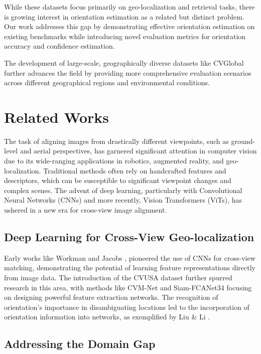 While these datasets focus primarily on geo-localization and retrieval tasks, there is growing interest in orientation estimation as a related but distinct problem. Our work addresses this gap by demonstrating effective orientation estimation on existing benchmarks while introducing novel evaluation metrics for orientation accuracy and confidence estimation.

The development of large-scale, geographically diverse datasets like CVGlobal further advances the field by providing more comprehensive evaluation scenarios across different geographical regions and environmental conditions.



\section{Related Works}

The task of aligning images from drastically different viewpoints, such as ground-level and aerial perspectives, has garnered significant attention in computer vision due to its wide-ranging applications in robotics, augmented reality, and geo-localization. 
Traditional methods often rely on handcrafted features and descriptors, which can be susceptible to significant viewpoint changes and complex scenes. The advent of deep learning, particularly with Convolutional Neural Networks (CNNs) and more recently, Vision Transformers (ViTs), has ushered in a new era for cross-view image alignment.

\subsection{Deep Learning for Cross-View Geo-localization}

Early works like Workman and Jacobs \cite{workman2015wide}, \cite{workman2015learning} pioneered the use of CNNs for cross-view matching, demonstrating the potential of learning feature representations directly from image data. The introduction of the CVUSA dataset \cite{zhai2017cvusa} further spurred research in this area, with methods like CVM-Net \cite{Hu_2018_CVPR} and Siam-FCANet34 \cite{9579411} focusing on designing powerful feature extraction networks. The recognition of orientation's importance in disambiguating locations led to the incorporation of orientation information into networks, as exemplified by Liu \& Li \cite{9360609}.

\subsection{Addressing the Domain Gap}

